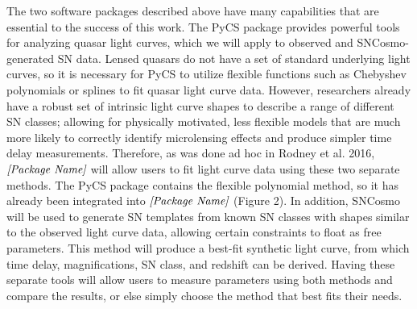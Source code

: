 The two software packages described above have many capabilities that are essential to the success of this work. The PyCS package provides powerful tools for analyzing quasar light curves, which we will apply to observed and SNCosmo-generated SN data. Lensed quasars do not have a set of standard underlying light curves, so it is necessary for PyCS to utilize flexible functions such as Chebyshev polynomials or splines to fit quasar light curve data. However, researchers already have a robust set of intrinsic light curve shapes to describe a range of different SN classes; allowing for physically motivated, less flexible models that are much more likely to correctly identify microlensing effects and produce simpler time delay measurements. Therefore, as was done ad hoc in Rodney et al. 2016, $\textit{[Package Name]}$ will allow users to fit light curve data using these two separate methods. The PyCS package contains the flexible polynomial method, so it has already been integrated into $\textit{[Package Name]}$ (Figure 2). In addition, SNCosmo will be used to generate SN templates from known SN classes with shapes similar to the observed light curve data, allowing certain constraints to float as free parameters. This method will produce a best-fit synthetic light curve, from which time delay, magnifications, SN class, and redshift can be derived. Having these separate tools will allow users to measure parameters using both methods and compare the results, or else simply choose the method that best fits their needs.


